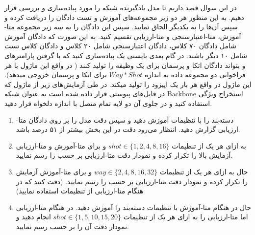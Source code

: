 \documentclass{article}
\begin{document}
در این سوال قصد داریم تا مدل یادگیرنده
شبکه
\href{https://arxiv.org/abs/1703.05175}{}
را مورد پیاده‌سازی و بررسی قرار دهیم. به این منظور هر دو زیر مجموعه‌های آموزش و تست دادگان
را دریافت کرده و سپس آن‌ها را به یکدیگر الحاق نمایید. 
سپس این دادگان را به سه زیر مجموعه
متا-آموزش، متا-اعتبارسنجی
 و متا-ارزیابی تقسیم کنید. به این صورت که دادگان آموزش شامل دادگان ۷۰ کلاس، دادگان اعتبارسنجی شامل ۲۰ کلاس و دادگان  کلاس تست شامل ۱۰ دیگر باشند.
در گام بعدی بایستی یک 
پیاده‌سازی کنید که با گرفتن پارامترهای
و
بتواند دادگان
اتکا و پرسمان برای یک وظیفه را تولید کنند ( در واقع این ماژول با هر فراخوانی دو مجموعه داده به اندازه
$Way * Shot$
برای اتکا و پرسمان خروجی میدهد). این ماژول در واقع هر بار یک اپیزود را تولید میکند.
در طی آزمایش‌های زیر از ماژول
که در فایل‌های پیوستی قرار داده شده است به عنوان شبکه Backbone استخراج ویژگی استفاده کنید و در جلوی آن دو لایه تمام متصل
 با اندازه دلخواه قرار دهید.

\begin{enumerate}


\item
دسته‌بند را با تنظیمات
آموزش دهید و سپس دقت مدل را بر روی دادگان متا-ارزیابی گزارش دهید.
انتظار می‌رود دقت در این بخش بیشتر از ۵۱ درصد باشد.

\item
به ازای هر یک از تنظیمات
$shot \in \{1, 2, 4, 8, 16\}$
و
برای متا-آموزش و متا-ارزیابی
آزمایش بالا را تکرار کرده و نمودار دقت متا-ارزیابی بر حسب
را رسم نمایید.

\item
حال به ازای هر یک از تنظیمات
$way \in \{2, 4, 8, 16, 32\}$
و
برای متا-آموزش
آزمایش را تکرار کرده و نمودار دقت متا-ارزیابی بر حسب
را رسم نمایید.
(دقت کنید که در هنگام متا-ارزیابی از تنظیمات
استفاده نمایید)


\item
حال در هنگام متا-آموزش با تنظیمات
دسته‌بند را آموزش دهید.
در هنگام متا-ارزیابی اما متا-ارزیابی را به ازای هر یک از تنظیمات
$shot \in \{1, 5,10, 15, 20\} $
انجام دهید و نمودار دقت آن را بر حسب 
رسم نمایید.

\end{enumerate}
\end{document}
